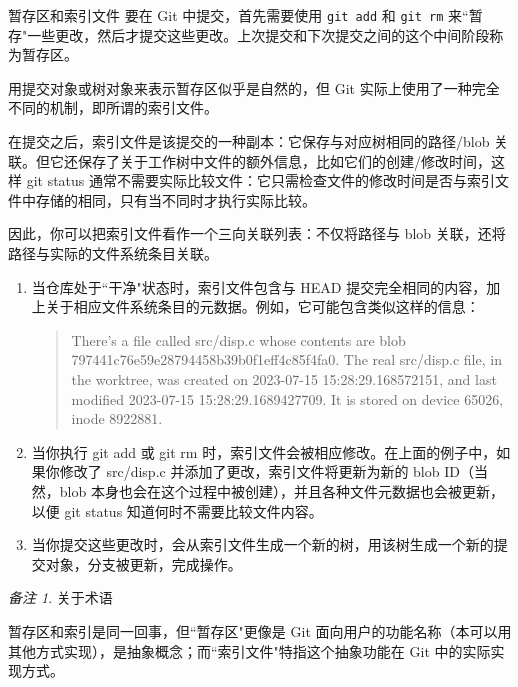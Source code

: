 \documentclass[aspectratio=169,xcolor=dvipsnames]{beamer}
\theoremstyle{remark}
\newtheorem*{remark}{备注}
\begin{document}
\begin{frame}{暂存区和索引文件}
要在 Git 中提交，首先需要使用 \lstinline|git add| 和 \lstinline|git rm| 来``暂存"一些更改，然后才提交这些更改。上次提交和下次提交之间的这个中间阶段称为暂存区。

用提交对象或树对象来表示暂存区似乎是自然的，但 Git 实际上使用了一种完全不同的机制，即所谓的索引文件。

在提交之后，索引文件是该提交的一种副本：它保存与对应树相同的路径/blob 关联。但它还保存了关于工作树中文件的额外信息，比如它们的创建/修改时间，这样 git status 通常不需要实际比较文件：它只需检查文件的修改时间是否与索引文件中存储的相同，只有当不同时才执行实际比较。

因此，你可以把索引文件看作一个三向关联列表：不仅将路径与 blob 关联，还将路径与实际的文件系统条目关联。

\begin{enumerate}
    \item 当仓库处于``干净"状态时，索引文件包含与 HEAD 提交完全相同的内容，加上关于相应文件系统条目的元数据。例如，它可能包含类似这样的信息：
      \begin{quote}
There’s a file called src/disp.c whose contents are blob 797441c76e59e28794458b39b0f1eff4c85f4fa0. The real src/disp.c file, in the worktree, was created on 2023-07-15 15:28:29.168572151, and last modified 2023-07-15 15:28:29.1689427709. It is stored on device 65026, inode 8922881.
      \end{quote}
    \item 当你执行 git add 或 git rm 时，索引文件会被相应修改。在上面的例子中，如果你修改了 src/disp.c 并添加了更改，索引文件将更新为新的 blob ID（当然，blob 本身也会在这个过程中被创建），并且各种文件元数据也会被更新，以便 git status 知道何时不需要比较文件内容。
    \item 当你提交这些更改时，会从索引文件生成一个新的树，用该树生成一个新的提交对象，分支被更新，完成操作。
\end{enumerate}
    \begin{remark}关于术语

    暂存区和索引是同一回事，但``暂存区"更像是 Git 面向用户的功能名称（本可以用其他方式实现），是抽象概念；而``索引文件"特指这个抽象功能在 Git 中的实际实现方式。\end{remark}
\end{frame}
\end{document}
